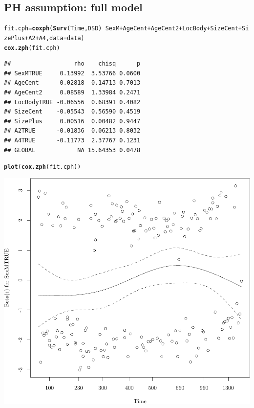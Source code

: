 \documentclass{article}\usepackage[]{graphicx}\usepackage[]{color}
\makeatletter
\def\maxwidth{ %
  \ifdim\Gin@nat@width>\linewidth
    \linewidth
  \else
    \Gin@nat@width
  \fi
}
\newcommand{\hlopt}[1]{\textcolor[rgb]{0,0,0}{#1}}%
\newcommand{\hlstd}[1]{\textcolor[rgb]{0.345,0.345,0.345}{#1}}%
\newcommand{\hlkwb}[1]{\textcolor[rgb]{0.69,0.353,0.396}{#1}}%
\newcommand{\hlkwc}[1]{\textcolor[rgb]{0.333,0.667,0.333}{#1}}%
\newcommand{\hlkwd}[1]{\textcolor[rgb]{0.737,0.353,0.396}{\textbf{#1}}}%
\newenvironment{kframe}{%
 \def\at@end@of@kframe{}%
 \ifinner\ifhmode%
  \def\at@end@of@kframe{\end{minipage}}%
  \begin{minipage}{\columnwidth}%
 \fi\fi%
 \def\FrameCommand##1{\hskip\@totalleftmargin \hskip-\fboxsep
 \colorbox{shadecolor}{##1}\hskip-\fboxsep
     \hskip-\linewidth \hskip-\@totalleftmargin \hskip\columnwidth}%
 \MakeFramed {\advance\hsize-\width
   \@totalleftmargin\z@ \linewidth\hsize
   \@setminipage}}%
 {\par\unskip\endMakeFramed%
 \at@end@of@kframe}
\newenvironment{knitrout}{}{} %
\makeatother
\begin{document}
\subsection{PH assumption: full model}
\begin{knitrout}
\color{fgcolor}\begin{kframe}
\begin{alltt}
\hlstd{fit.cph} \hlkwb{=} \hlkwd{coxph}\hlstd{(}\hlkwd{Surv}\hlstd{(Time, DSD)} \hlopt{~} \hlstd{SexM} \hlopt{+} \hlstd{AgeCent} \hlopt{+} \hlstd{AgeCent2} \hlopt{+} \hlstd{LocBody} \hlopt{+} \hlstd{SizeCent} \hlopt{+} \hlstd{SizePlus} \hlopt{+} \hlstd{A2} \hlopt{+} \hlstd{A4,} \hlkwc{data} \hlstd{= data)}
\hlkwd{cox.zph}\hlstd{(fit.cph)}
\end{alltt}
\begin{verbatim}
##                  rho    chisq      p
## SexMTRUE     0.13992  3.53766 0.0600
## AgeCent      0.02818  0.14713 0.7013
## AgeCent2     0.08589  1.33984 0.2471
## LocBodyTRUE -0.06556  0.68391 0.4082
## SizeCent    -0.05543  0.56590 0.4519
## SizePlus     0.00516  0.00482 0.9447
## A2TRUE      -0.01836  0.06213 0.8032
## A4TRUE      -0.11773  2.37767 0.1231
## GLOBAL            NA 15.64353 0.0478
\end{verbatim}
\begin{alltt}
\hlkwd{plot}\hlstd{(}\hlkwd{cox.zph}\hlstd{(fit.cph))}
\end{alltt}
\end{kframe}

{\centering \includegraphics[width=\maxwidth]{figure/05-eda-ph-check-full-1} 

}
\end{knitrout}
\end{document}
